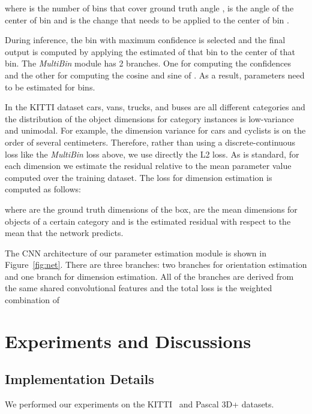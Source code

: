 \documentclass[10pt,twocolumn,letterpaper]{article}
\begin{document}
where  is the number of bins that cover ground truth angle ,  is the angle of the center of bin  and  is the change that needs to be applied to the center of bin .

During inference, the bin with maximum confidence is selected and the final output is computed by applying the estimated   of that bin to the center of that bin. The {\em MultiBin} module has 2 branches. One for computing the confidences  and the other for computing the cosine and sine of . As a result,  parameters need to be estimated for  bins.

In the KITTI dataset cars, vans, trucks, and buses are all different categories and the distribution of the object dimensions for category instances is low-variance and unimodal. For example, the dimension variance for cars and cyclists is on the order of several centimeters. Therefore, rather than using a discrete-continuous loss like the {\em MultiBin} loss above, we use directly the L2 loss. As is standard, for each dimension we estimate the residual relative to the mean parameter value computed over the training dataset. The loss for dimension estimation  is computed as follows:

where  are the ground truth dimensions of the box,  are the mean dimensions for objects of a certain category and  is the estimated residual with respect to the mean that the network predicts.

The CNN architecture of our parameter estimation module is shown in Figure~\ref{fig:net}. 
There are three branches: two branches for orientation estimation and one branch for dimension estimation. All of the branches are derived from the same shared convolutional features and the total loss is the weighted combination of 
\section{Experiments and Discussions}
\subsection{Implementation Details}
 We performed our experiments on the KITTI~\cite{KITTICVPR12} and Pascal 3D+\cite{XiangSavareseWACV14} datasets.
\end{document}
